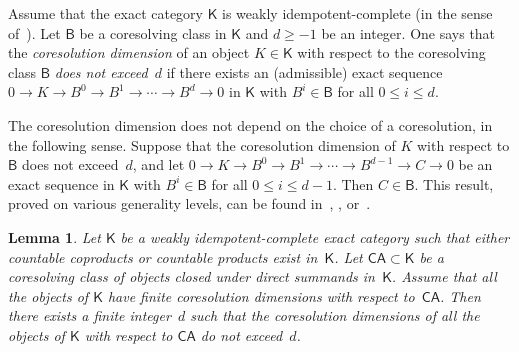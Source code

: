 \documentclass[12pt,a4paper]{amsart}
\newcommand{\+}{\nobreakdash-}
\renewcommand{\:}{\colon}
\newcommand{\rarrow}{\longrightarrow}
\newcommand{\sB}{\mathsf B}
\newcommand{\sK}{\mathsf K}
\newcommand{\CA}{\mathsf{CA}}
\theoremstyle{plain}
\newtheorem{lem}[thm]{Lemma}
\theoremstyle{definition}
\begin{document}
 Assume that the exact category $\sK$ is weakly idempotent-complete
(in the sense of~\cite[Section~7]{Bueh}).
 Let $\sB$ be a coresolving class in $\sK$ and $d\ge-1$ be an integer.
 One says that the \emph{coresolution dimension} of an object
$K\in\sK$ with respect to the coresolving class $\sB$ \emph{does not
exceed~$d$} if there exists an (admissible) exact sequence $0\rarrow K
\rarrow B^0\rarrow B^1\rarrow\dotsb\rarrow B^d\rarrow0$ in $\sK$ with
$B^i\in\sB$ for all $0\le i\le d$.

 The coresolution dimension does not depend on the choice of
a coresolution, in the following sense.
 Suppose that the coresolution dimension of $K$ with respect to $\sB$
does not exceed~$d$, and let $0\rarrow K\rarrow B^0\rarrow B^1\rarrow
\dotsb\rarrow B^{d-1}\rarrow C\rarrow0$ be an exact sequence in $\sK$
with $B^i\in\sB$ for all $0\le i\le d-1$.
 Then $C\in\sB$.
 This result, proved on various generality levels, can be found
in~\cite[Lemma~2.1]{Zhu}, \cite[Proposition~2.3]{Sto0},
or~\cite[Corollary~A.5.2]{Pcosh}.

\begin{lem} \label{finite-coresolution-dimensions-are-bounded}
 Let\/ $\sK$ be a weakly idempotent-complete exact category such that
either countable coproducts or countable products exist in\/~$\sK$.
 Let\/ $\CA\subset\sK$ be a coresolving class of objects closed under
direct summands in\/~$\sK$.
 Assume that all the objects of\/ $\sK$ have finite coresolution
dimensions with respect to\/~$\CA$.
 Then there exists a finite integer~$d$ such that the coresolution
dimensions of all the objects of\/ $\sK$ with respect to\/ $\CA$ do
not exceed~$d$.
\end{lem}
\end{document}
